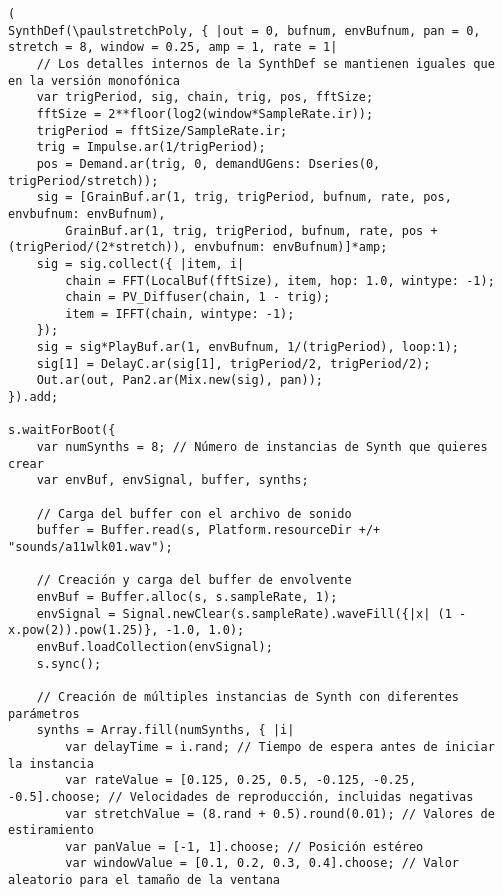 \begin{minipage}[t]{1\textwidth}
    \centering
    \begin{lstlisting}[style=SuperCollider-IDE, basicstyle=\footnotesize\ttfamily, numbers=none]
(
SynthDef(\paulstretchPoly, { |out = 0, bufnum, envBufnum, pan = 0, stretch = 8, window = 0.25, amp = 1, rate = 1|
    // Los detalles internos de la SynthDef se mantienen iguales que en la versión monofónica
    var trigPeriod, sig, chain, trig, pos, fftSize;
    fftSize = 2**floor(log2(window*SampleRate.ir));
    trigPeriod = fftSize/SampleRate.ir;
    trig = Impulse.ar(1/trigPeriod);
    pos = Demand.ar(trig, 0, demandUGens: Dseries(0, trigPeriod/stretch));
    sig = [GrainBuf.ar(1, trig, trigPeriod, bufnum, rate, pos, envbufnum: envBufnum),
        GrainBuf.ar(1, trig, trigPeriod, bufnum, rate, pos + (trigPeriod/(2*stretch)), envbufnum: envBufnum)]*amp;
    sig = sig.collect({ |item, i|
        chain = FFT(LocalBuf(fftSize), item, hop: 1.0, wintype: -1);
        chain = PV_Diffuser(chain, 1 - trig);
        item = IFFT(chain, wintype: -1);
    });
    sig = sig*PlayBuf.ar(1, envBufnum, 1/(trigPeriod), loop:1);
    sig[1] = DelayC.ar(sig[1], trigPeriod/2, trigPeriod/2);
    Out.ar(out, Pan2.ar(Mix.new(sig), pan));
}).add;

s.waitForBoot({
    var numSynths = 8; // Número de instancias de Synth que quieres crear
    var envBuf, envSignal, buffer, synths;

    // Carga del buffer con el archivo de sonido
    buffer = Buffer.read(s, Platform.resourceDir +/+ "sounds/a11wlk01.wav");

    // Creación y carga del buffer de envolvente
    envBuf = Buffer.alloc(s, s.sampleRate, 1);
    envSignal = Signal.newClear(s.sampleRate).waveFill({|x| (1 - x.pow(2)).pow(1.25)}, -1.0, 1.0);
    envBuf.loadCollection(envSignal);
    s.sync();

    // Creación de múltiples instancias de Synth con diferentes parámetros
    synths = Array.fill(numSynths, { |i|
        var delayTime = i.rand; // Tiempo de espera antes de iniciar la instancia
        var rateValue = [0.125, 0.25, 0.5, -0.125, -0.25, -0.5].choose; // Velocidades de reproducción, incluidas negativas
        var stretchValue = (8.rand + 0.5).round(0.01); // Valores de estiramiento
        var panValue = [-1, 1].choose; // Posición estéreo
        var windowValue = [0.1, 0.2, 0.3, 0.4].choose; // Valor aleatorio para el tamaño de la ventana


\end{lstlisting}
\end{minipage}

